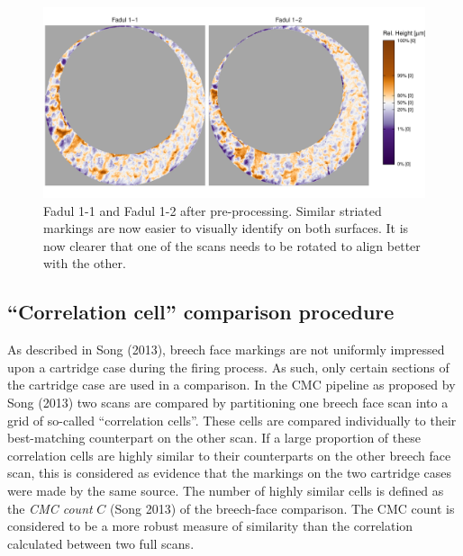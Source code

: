 \begin{figure}[htbp]

{\centering \includegraphics[width=\textwidth]{figures/cmcr-processedScans-1} 

}

\caption{Fadul 1-1 and Fadul 1-2 after pre-processing. Similar striated markings are now easier to visually identify on both surfaces. It is now clearer that one of the scans needs to be rotated to align better with the other.}\label{fig:processedScans}
\end{figure}

\hypertarget{comparisonProcedure}{%
\subsection{``Correlation cell'' comparison procedure}\label{comparisonProcedure}}

As described in Song (2013), breech face markings are not uniformly impressed upon a cartridge case during the firing process.
As such, only certain sections of the cartridge case are used in a comparison.
In the CMC pipeline as proposed by Song (2013) two scans are compared by partitioning one breech face scan into a grid of so-called ``correlation cells''.
These cells are compared individually to their best-matching counterpart on the other scan.
If a large proportion of these correlation cells are highly similar to their counterparts on the other breech face scan, this is considered as evidence that the markings on the two cartridge cases were made by the same source.
The number of highly similar cells is defined as the \emph{CMC count} \(C\) (Song 2013) of the breech-face comparison.
The CMC count is considered to be a more robust measure of similarity than the correlation calculated between two full scans.

